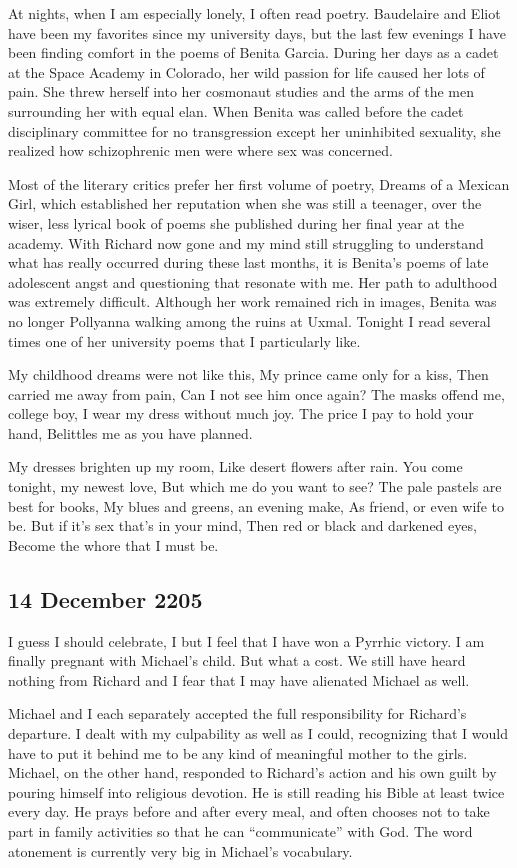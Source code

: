 \documentclass[]{article}
\begin{document}
At nights, when I am especially lonely, I often read poetry. Baudelaire and Eliot have been my favorites since my university days, but the last few evenings I have been finding comfort in the poems of Benita Garcia. During her days as a cadet at the Space Academy in Colorado, her wild passion for life caused her lots of pain. She threw herself into her cosmonaut studies and the arms of the men surrounding her with equal elan. When Benita was called before the cadet disciplinary committee for no transgression except her uninhibited sexuality, she realized how schizophrenic men were where sex was concerned.

Most of the literary critics prefer her first volume of poetry, Dreams of a Mexican Girl, which established her reputation when she was still a teenager, over the wiser, less lyrical book of poems she published during her final year at the academy. With Richard now gone and my mind still struggling to understand what has really occurred during these last months, it is Benita’s poems of late adolescent angst and questioning that resonate with me. Her path to adulthood was extremely difficult. Although her work remained rich in images, Benita was no longer Pollyanna walking among the ruins at Uxmal. Tonight I read several times one of her university poems that I particularly like.

My childhood dreams were not like this, My prince came only for a kiss, Then carried me away from pain, Can I not see him once again? The masks offend me, college boy, I wear my dress without much joy. The price I pay to hold your hand, Belittles me as you have planned.

My dresses brighten up my room, Like desert flowers after rain. You come tonight, my newest love, But which me do you want to see? The pale pastels are best for books, My blues and greens, an evening make, As friend, or even wife to be. But if it’s sex that’s in your mind, Then red or black and darkened eyes, Become the whore that I must be.

\subsection{14 December 2205}

I guess I should celebrate, I but I feel that I have won a Pyrrhic victory. I am finally pregnant with Michael’s child. But what a cost. We still have heard nothing from Richard and I fear that I may have alienated Michael as well.

Michael and I each separately accepted the full responsibility for Richard’s departure. I dealt with my culpability as well as I could, recognizing that I would have to put it behind me to be any kind of meaningful mother to the girls. Michael, on the other hand, responded to Richard’s action and his own guilt by pouring himself into religious devotion. He is still reading his Bible at least twice every day. He prays before and after every meal, and often chooses not to take part in family activities so that he can “communicate” with God. The word atonement is currently very big in Michael’s vocabulary.
\end{document}
